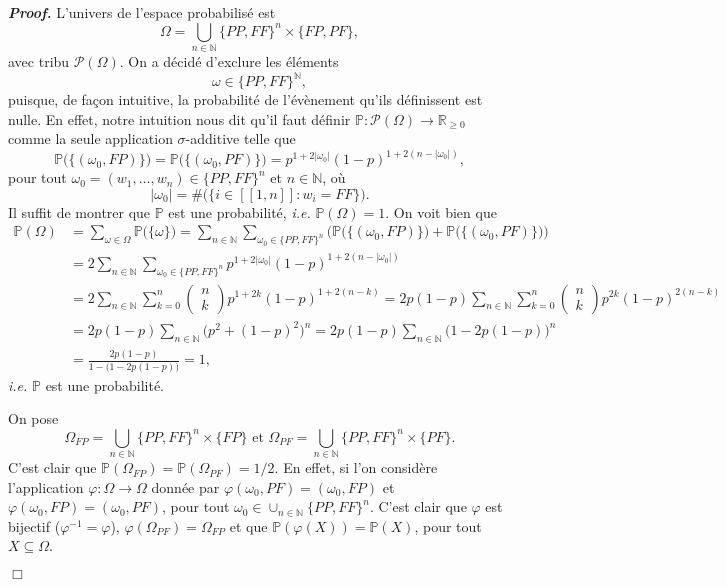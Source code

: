 \documentclass[11pt,a4paper]{article}
\newcommand{\NN}{\mathbb{N}}
\newenvironment{preuve}[1][]
{\vskip 2mm  \noindent\emph{\bf Proof#1. }}{$\Box$ \vskip 2mm}
\let\geq\geqslant
\begin{document}
		\begin{preuve}
			L'univers de l'espace probabilisé est 
			\[     \Omega = \bigcup_{n \in \NN} \{ PP, FF \}^{n} \times \{ FP, PF \},     \]
			avec tribu $\mathscr{P}(\Omega)$. 
			On a décidé d'exclure les éléments 
			\[     \omega \in \{ PP, FF \}^{\NN},     \]
			puisque, de façon intuitive, la probabilité de l'évènement qu'ils définissent est nulle. 
			En effet, notre intuition nous dit qu'il faut définir $\mathbb{P} : \mathscr{P}(\Omega) \rightarrow \mathbb{R}_{\geq 0}$ comme la seule application $\sigma$-additive telle que 
			\[     \mathbb{P}\Big(\big\{ (\omega_{0},FP) \big\} \Big) = \mathbb{P}\Big(\big\{ (\omega_{0},PF) \big\} \Big) = p^{1+2 |\omega_{0}|} (1-p)^{1+2 (n - |\omega_{0}|)},     \]
			pour tout $\omega_{0}=(w_{1},\dots,w_{n}) \in \{ PP, FF \}^{n}$ et $n \in \NN$, où 
			\[     |\omega_{0}| = \#\Big(\big\{ i \in [\![ 1, n ]\!] : w_{i} = FF \big\}\Big).     \]
			Il suffit de montrer que $\mathbb{P}$ est une probabilité, \textit{i.e.} $\mathbb{P}(\Omega) = 1$. 
			On voit bien que 
			\begin{equation*}
			\begin{split}
			\mathbb{P}(\Omega) &= \sum_{\omega \in \Omega} \mathbb{P}\big(\{ \omega \} \big) 
			= \sum_{n \in \NN} \sum_{\omega_{0} \in \{ PP, FF \}^{n}} \Bigg( \mathbb{P}\Big(\big\{ (\omega_{0},FP) \big\} \Big) + \mathbb{P}\Big(\big\{ (\omega_{0},PF) \big\} \Big) \bigg)
			\\
			&= 2 \sum_{n \in \NN} \sum_{\omega_{0} \in \{ PP, FF \}^{n}} p^{1+2 |\omega_{0}|} (1-p)^{1+2 (n - |\omega_{0}|)}
			\\
			&= 2 \sum_{n \in \NN} \sum_{k = 0}^{n} \begin{pmatrix} n \\ k \end{pmatrix} p^{1+2 k} (1-p)^{1+2 (n - k)}
			= 2 p (1-p) \sum_{n \in \NN} \sum_{k = 0}^{n} \begin{pmatrix} n \\ k \end{pmatrix} p^{2 k} (1-p)^{2 (n - k)}
			\\
			&= 2 p (1-p) \sum_{n \in \NN} \big(p^{2} + (1-p)^{2}\big)^{n} = 2 p (1-p) \sum_{n \in \NN} \big(1 - 2 p (1 - p)\big)^{n} 
			\\
			&= \frac{2 p (1-p)}{1 - \big(1 - 2 p (1 - p)\big)} = 1,
			\end{split}
			\end{equation*}
			\textit{i.e.} $\mathbb{P}$ est une probabilité. 
			
			On pose 
			\[     \Omega_{FP} = \bigcup_{n \in \NN} \{ PP, FF \}^{n} \times \{ FP\} \text{ et } \Omega_{PF} = \bigcup_{n \in \NN} \{ PP, FF \}^{n} \times \{ PF\}.     \]
			C'est clair que $\mathbb{P}(\Omega_{FP}) = \mathbb{P}(\Omega_{PF}) = 1/2$. 
			En effet, si l'on considère l'application $\varphi : \Omega \rightarrow \Omega$ donnée par 
			$\varphi(\omega_{0},PF) = (\omega_{0},FP)$ et $\varphi(\omega_{0},FP) = (\omega_{0},PF)$, pour tout 
			$\omega_{0} \in \cup_{n \in \NN} \{ PP, FF \}^{n}$. 
			C'est clair que $\varphi$ est bijectif ($\varphi^{-1} = \varphi$), $\varphi(\Omega_{PF}) = \Omega_{FP}$ et que $\mathbb{P}(\varphi(X)) = \mathbb{P}(X)$, pour tout $X \subseteq \Omega$.
			

\end{preuve}
\end{document}
